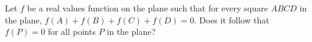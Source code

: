 Let $f$ be a real values function on the plane such that for every square $ABCD$ in the plane, $f(A)+f(B)+f(C)+f(D)=0$. Does it follow that $f(P)=0$ for all points $P$ in the plane?